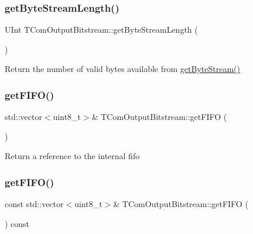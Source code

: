 \subsubsection{\texorpdfstring{get\+Byte\+Stream\+Length()}{getByteStreamLength()}}
{\footnotesize\ttfamily U\+Int T\+Com\+Output\+Bitstream\+::get\+Byte\+Stream\+Length (\begin{DoxyParamCaption}{ }\end{DoxyParamCaption})}

Return the number of valid bytes available from \hyperlink{class_t_com_output_bitstream_a5cad8768ff2ebd63d447500bd1d67848}{get\+Byte\+Stream()} \mbox{\label{class_t_com_output_bitstream_aba619d657e7772f3736a15d4d03706d6}} 
\subsubsection{\texorpdfstring{get\+F\+I\+F\+O()}{getFIFO()}\hspace{0.1cm}{\footnotesize\ttfamily [1/2]}}
{\footnotesize\ttfamily std\+::vector$<$uint8\+\_\+t$>$\& T\+Com\+Output\+Bitstream\+::get\+F\+I\+FO (\begin{DoxyParamCaption}{ }\end{DoxyParamCaption})\hspace{0.3cm}{\ttfamily [inline]}}

Return a reference to the internal fifo \mbox{\label{class_t_com_output_bitstream_a9b50f1e205ae3927803142d5cf74932c}} 
\subsubsection{\texorpdfstring{get\+F\+I\+F\+O()}{getFIFO()}\hspace{0.1cm}{\footnotesize\ttfamily [2/2]}}
{\footnotesize\ttfamily const std\+::vector$<$uint8\+\_\+t$>$\& T\+Com\+Output\+Bitstream\+::get\+F\+I\+FO (\begin{DoxyParamCaption}{ }\end{DoxyParamCaption}) const\hspace{0.3cm}{\ttfamily [inline]}}

